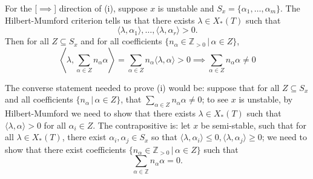 \documentclass[12pt]{amsart}
\newcommand{\Z}{\mathbb{Z}}
\theoremstyle{remark}
\theoremstyle{remark}
\theoremstyle{remark}
\begin{document}
For the [$\implies$] direction of (i), suppose $x$ is unstable and $S_x = \{\alpha_1, \ldots, \alpha_m\}$.
The Hilbert-Mumford criterion tells us that there exists $\lambda \in X_*(T)$ such that 
$$\langle \lambda, \alpha_1 \rangle, \ldots, \langle \lambda, \alpha_r \rangle > 0.$$
Then for all $Z \subseteq S_x$ and for all coefficients $\{n_\alpha \in \Z_{>0} \, | \, \alpha \in Z\}$,
$$\left\langle\lambda, \sum_{\alpha \in Z}  n_\alpha  \alpha \right \rangle
= \sum_{\alpha \in Z} n_\alpha  \langle \lambda, \alpha \rangle > 0 \implies \sum_{\alpha \in Z}  n_\alpha  \alpha \ne 0$$

The converse statement needed to prove (i) would be: 
suppose that for all $Z \subseteq S_x$ and all coefficients $\{n_\alpha \, | \, \alpha \in Z\}$, that $\sum_{\alpha \in Z} n_\alpha \alpha \ne 0$; to see $x$ is unstable, by Hilbert-Mumford we need to show that there exists $\lambda \in X_*(T)$ such that $\langle \lambda, \alpha \rangle > 0$ for all $\alpha_i \in Z$.
The contrapositive is: 
let $x$ be semi-stable, such that for all $\lambda \in X_*(T)$, there exist $\alpha_i, \alpha_j \in S_x$ so that $\langle \lambda, \alpha_i \rangle \le 0, \langle \lambda, \alpha_j \rangle \ge 0$; 
we need to show that there exist coefficients $\{n_\alpha \in \mathbb{Z}_{>0} \, | \, \alpha \in Z\}$ such that 
$$\sum_{\alpha \in \Z} n_\alpha \alpha = 0.$$

\begin{bibdiv}
\begin{biblist}


\end{biblist}
\end{bibdiv}
\end{document}
